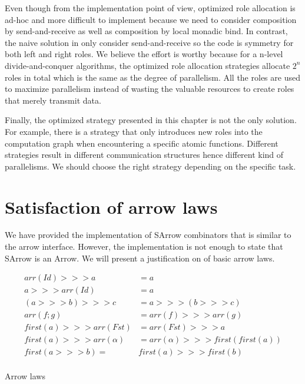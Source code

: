 Even though from the implementation point of view, optimized role allocation is ad-hoc and more difficult to implement because we need to consider composition by send-and-receive as well as composition by local monadic bind. In contrast, the naive solution in  only consider send-and-receive so the code is symmetry for both left and right roles. We believe the effort is worthy because for a n-level divide-and-conquer algorithms, the optimized role allocation strategies allocate $2^n$ roles in total which is the same as the degree of parallelism. All the roles are used to maximize parallelism instead of wasting the valuable resources to create roles that merely transmit data.

Finally, the optimized strategy presented in this chapter is not the only solution. For example, there is a strategy that only introduces new roles into the computation graph when encountering a specific atomic functions. Different strategies result in different communication structures hence different kind of parallelisms. We should choose the right strategy depending on the specific task.
\section{Satisfaction of arrow laws}
We have provided the implementation of SArrow combinators that is similar to the arrow interface. However, the implementation is not enough to state that SArrow is an Arrow. We will present a justification on of basic arrow laws.
\begin{table}[ht]
    \begin{align*}
        arr(Id) >>> a &= a \tag{1}\\
        a >>> arr(Id) &= a \tag{2}\\
        (a >>> b) >>> c &= a >>> (b >>> c) \tag{3}\\
        arr(f;g) &= arr(f) >>> arr(g) \tag{4}\\
        first(a) >>> arr(Fst) &= arr(Fst) >>> a \tag{5}\\
        first(a) >>> arr(\alpha) &= arr(\alpha) >>> first(first(a)) \tag{6}\\
        first(a >>> b) =& first(a) >>> first(b) \tag{7}\\
    \end{align*}
    \caption{Arrow laws \cite{atkeyWhatCategoricalModel2011}}
    \label{arrow:tab:law}
\end{table}

